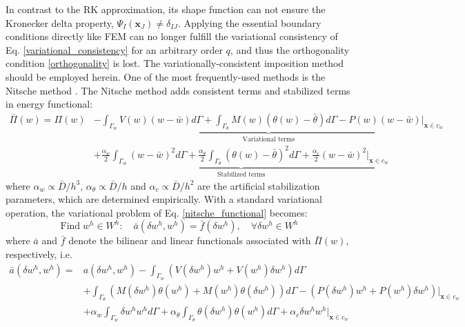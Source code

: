 In contrast to the RK approximation, its shape function can not ensure the Kronecker delta property, $\Psi_I(\boldsymbol x_J) \neq \delta_{IJ}$.
Applying the essential boundary conditions directly like FEM can no longer fulfill the variational consistency of Eq. \eqref{variational_consistency} for an arbitrary order $q$, and thus the orthogonality condition \eqref{orthogonality} is lost.
The variationally-consistent imposition method should be employed herein.
One of the most frequently-used methods is the Nitsche method \cite{}.
The Nitsche method adds consistent terms and stabilized terms in energy functional:
\begin{equation}\label{nitsche_functional}
	\begin{aligned}
		\bar \Pi(w) = \Pi(w) &\underbrace{- \int_{\Gamma_{w}} V(w)(w - \bar w) d\Gamma + \int_{\Gamma_{\theta}} M(w)(\theta(w) - \bar \theta) d\Gamma - P(w)(w - \bar w)\vert_{\boldsymbol x \in c_w}}_{\textrm{Variational terms}} \\
		&\underbrace{+ \frac{\alpha_w}{2} \int_{\Gamma_{w}} (w - \bar w)^2 d\Gamma + \frac{\alpha_\theta}{2} \int_{\Gamma_{\theta}} (\theta(w) - \bar \theta)^2 d\Gamma + \frac{\alpha_c}{2} (w - \bar w)^2\vert_{\boldsymbol x \in c_w}}_{\textrm{Stabilized terms}}
	\end{aligned}
\end{equation}
where $\alpha_w\propto\bar D/h^{3}$, $\alpha_\theta\propto\bar D/h$ and $\alpha_c\propto\bar D/h^{2}$ are the artificial stabilization parameters, which are determined empirically.
With a standard variational operation, the variational problem of Eq. \eqref{nitsche_functional} becomes:
\begin{equation}\label{nitsche_weakform}
	\textrm{Find} \; w^h \in W^h: \quad \bar a(\delta w^h, w^h) = \bar f(\delta w^h), \quad \forall \delta w^h \in W^h
\end{equation}
where $\bar a$ and $\bar f$ denote the bilinear and linear functionals associated with $\bar \Pi(w)$, respectively, i.e.
\begin{equation}\label{nitsche_bilinear}
	\begin{aligned}
		\bar a(\delta w^h, w^h) ={}& a(\delta w^h, w^h)
		- \int_{\Gamma_{w}} \left( V(\delta w^h) w^h + V(w^h) \delta w^h \right) d\Gamma \\
		&+ \int_{\Gamma_{\theta}} \left( M(\delta w^h) \theta(w^h) + M(w^h) \theta(\delta w^h) \right) d\Gamma 
		- \left( P(\delta w^h) w^h + P(w^h) \delta w^h \right) \vert_{\boldsymbol x \in c_w} \\
		&+ \alpha_w \int_{\Gamma_{w}} \delta w^h w^h d\Gamma + \alpha_\theta \int_{\Gamma_{\theta}} \theta(\delta w^h) \theta(w^h) d\Gamma + \alpha_c \delta w^h w^h \vert_{\boldsymbol x \in c_w}
	\end{aligned}
\end{equation}
